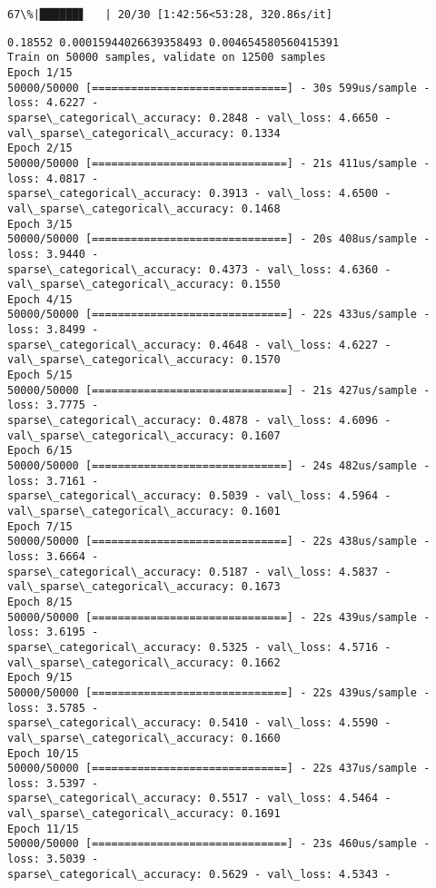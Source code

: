 \documentclass[11pt]{article}
\begin{document}
    \begin{Verbatim}[commandchars=\\\{\}]
 67\%|██████▋   | 20/30 [1:42:56<53:28, 320.86s/it]
    \end{Verbatim}

    \begin{Verbatim}[commandchars=\\\{\}]
0.18552 0.00015944026639358493 0.004654580560415391
Train on 50000 samples, validate on 12500 samples
Epoch 1/15
50000/50000 [==============================] - 30s 599us/sample - loss: 4.6227 -
sparse\_categorical\_accuracy: 0.2848 - val\_loss: 4.6650 -
val\_sparse\_categorical\_accuracy: 0.1334
Epoch 2/15
50000/50000 [==============================] - 21s 411us/sample - loss: 4.0817 -
sparse\_categorical\_accuracy: 0.3913 - val\_loss: 4.6500 -
val\_sparse\_categorical\_accuracy: 0.1468
Epoch 3/15
50000/50000 [==============================] - 20s 408us/sample - loss: 3.9440 -
sparse\_categorical\_accuracy: 0.4373 - val\_loss: 4.6360 -
val\_sparse\_categorical\_accuracy: 0.1550
Epoch 4/15
50000/50000 [==============================] - 22s 433us/sample - loss: 3.8499 -
sparse\_categorical\_accuracy: 0.4648 - val\_loss: 4.6227 -
val\_sparse\_categorical\_accuracy: 0.1570
Epoch 5/15
50000/50000 [==============================] - 21s 427us/sample - loss: 3.7775 -
sparse\_categorical\_accuracy: 0.4878 - val\_loss: 4.6096 -
val\_sparse\_categorical\_accuracy: 0.1607
Epoch 6/15
50000/50000 [==============================] - 24s 482us/sample - loss: 3.7161 -
sparse\_categorical\_accuracy: 0.5039 - val\_loss: 4.5964 -
val\_sparse\_categorical\_accuracy: 0.1601
Epoch 7/15
50000/50000 [==============================] - 22s 438us/sample - loss: 3.6664 -
sparse\_categorical\_accuracy: 0.5187 - val\_loss: 4.5837 -
val\_sparse\_categorical\_accuracy: 0.1673
Epoch 8/15
50000/50000 [==============================] - 22s 439us/sample - loss: 3.6195 -
sparse\_categorical\_accuracy: 0.5325 - val\_loss: 4.5716 -
val\_sparse\_categorical\_accuracy: 0.1662
Epoch 9/15
50000/50000 [==============================] - 22s 439us/sample - loss: 3.5785 -
sparse\_categorical\_accuracy: 0.5410 - val\_loss: 4.5590 -
val\_sparse\_categorical\_accuracy: 0.1660
Epoch 10/15
50000/50000 [==============================] - 22s 437us/sample - loss: 3.5397 -
sparse\_categorical\_accuracy: 0.5517 - val\_loss: 4.5464 -
val\_sparse\_categorical\_accuracy: 0.1691
Epoch 11/15
50000/50000 [==============================] - 23s 460us/sample - loss: 3.5039 -
sparse\_categorical\_accuracy: 0.5629 - val\_loss: 4.5343 -

\end{Verbatim}
\end{document}
